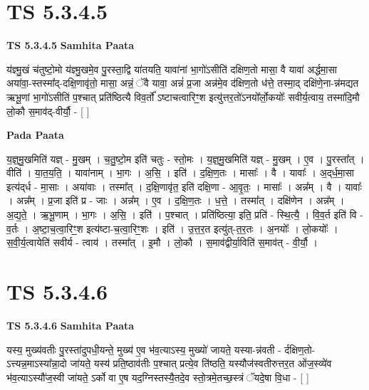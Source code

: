 \documentclass[17pt]{extarticle}
\begin{document}

\section{ TS 5.3.4.5 }

\textbf{TS 5.3.4.5 } \newline
\textbf{Samhita Paata} \newline

य॑ज्ञ्मु॒खं च॑तुष्टो॒मो य॑ज्ञ्मु॒खमे॒व पु॒रस्ता॒द्वि या॑तयति॒ यावा॑नां भा॒गो॑ऽसीति॑ दक्षिण॒तो मासा॒ वै यावा॑ अर्द्धमा॒सा अया॑वा॒-स्तस्मा᳚द्-दक्षि॒णावृ॑तो॒ मासा॒ अन्नं॒ ॅवै यावा॒ अन्नं॑ प्र॒जा अन्न॑मे॒व द॑क्षिण॒तो ध॑त्ते॒ तस्मा॒द् दक्षि॑णे॒ना-न्न॑मद्यत ऋभू॒णां भा॒गो॑ऽसीति॑ प॒श्चात् प्रति॑ष्ठित्यै विव॒र्तो᳚ ऽष्टाचत्वारिꣳ॒॒श इत्यु॑त्तर॒तो॑ऽनयो᳚र्लो॒कयोः᳚ सवीर्य॒त्वाय॒ तस्मा॑दि॒मौ लो॒कौ स॒माव॑द्-वीर्यौ॒ - [  ] \newline

\textbf{Pada Paata} \newline

य॒ज्ञ्॒मु॒खमिति॑ यज्ञ् - मु॒खम् । च॒तु॒ष्टो॒म इति॑ चतुः - स्तो॒मः । य॒ज्ञ्॒मु॒खमिति॑ यज्ञ् - मु॒खम् । ए॒व । पु॒रस्ता᳚त् । वीति॑ । या॒त॒य॒ति॒ । यावा॑नाम् । भा॒गः । अ॒सि॒ । इति॑ । द॒क्षि॒ण॒तः । मासाः᳚ । वै । यावाः᳚ । अ॒द्‌र्ध॒मा॒सा इत्य॑द्‌र्ध - मा॒साः । अया॑वाः । तस्मा᳚त् । द॒क्षि॒णावृ॑त॒ इति॑ दक्षि॒णा - आ॒वृ॒तः॒ । मासाः᳚ । अन्न᳚म् । वै । यावाः᳚ । अन्न᳚म् । प्र॒जा इति॑ प्र - जाः । अन्न᳚म् । ए॒व । द॒क्षि॒ण॒तः । ध॒त्ते॒ । तस्मा᳚त् । दक्षि॑णेन । अन्न᳚म् । अ॒द्य॒ते॒ । ऋ॒भू॒णाम् । भा॒गः । अ॒सि॒ । इति॑ । प॒श्चात् । प्रति॑ष्ठित्या॒ इति॒ प्रति॑ - स्थि॒त्यै॒ । वि॒व॒र्त इति॑ वि - व॒र्तः । अ॒ष्टा॒च॒त्वा॒रिꣳ॒॒श इत्य॑ष्टा-च॒त्वा॒रिꣳ॒॒शः । इति॑ । उ॒त्त॒र॒त इत्यु॑त्-त॒र॒तः । अ॒नयोः᳚ । लो॒कयोः᳚ । स॒वी॒र्य॒त्वायेति॑ सवीर्य - त्वाय॑ । तस्मा᳚त् । इ॒मौ । लो॒कौ । स॒माव॑द्वीर्या॒विति॑ स॒माव॑त् - वी॒र्यौ॒ ।  \newline





\section{ TS 5.3.4.6 }

\textbf{TS 5.3.4.6 } \newline
\textbf{Samhita Paata} \newline

यस्य॒ मुख्य॑वतीः पु॒रस्ता॑दुपधी॒यन्ते॒ मुख्य॑ ए॒व भ॑व॒त्याऽस्य॒ मुख्यो॑ जायते॒ यस्या-न्न॑वती - र्दक्षिण॒तो-ऽत्त्यन्न॒माऽस्या᳚न्ना॒दो जा॑यते॒ यस्य॑ प्रति॒ष्ठाव॑तीः प॒श्चात् प्रत्ये॒व ति॑ष्ठति॒ यस्यौज॑स्वतीरुत्तर॒त ओ॑ज॒स्व्ये॑व भ॑व॒त्याऽस्यौ॑ज॒स्वी जा॑यते॒ ऽर्को वा ए॒ष यद॒ग्निस्तस्यै॒तदे॒व स्तो॒त्रमे॒तच्छ॒स्त्रं ॅयदे॒षा वि॒धा - [  ] \newline
\end{document}
